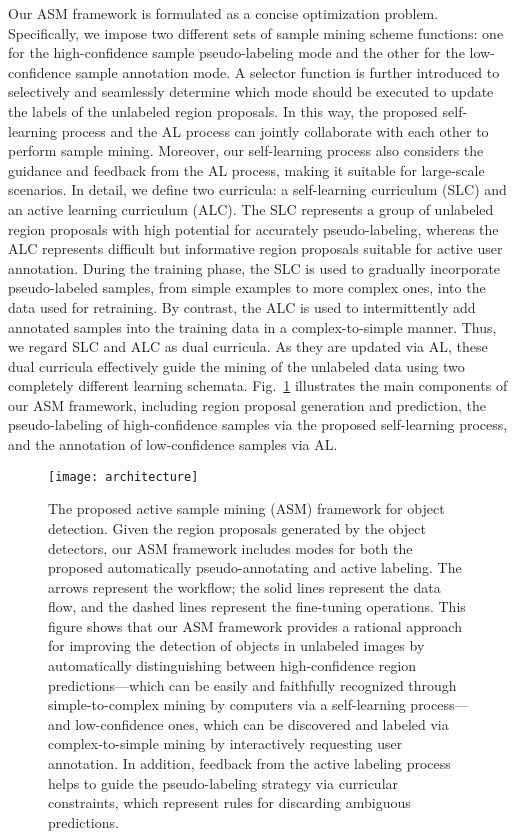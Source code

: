\documentclass[journal]{IEEEtran}
\begin{document}
Our {ASM} framework is formulated as a concise optimization problem. Specifically, we impose two different sets of sample mining scheme functions: one for the high-confidence sample pseudo-labeling mode and the other for the low-confidence sample annotation mode. A selector function is further introduced to {selectively and} seamlessly determine which mode should be executed to update the labels of the unlabeled region proposals. In this way, the proposed {self-learning} process and the AL process can jointly collaborate with each other to perform sample mining. Moreover, {our self-learning} process also considers {the} guidance and feedback from the AL process, making it suitable for large-scale scenarios. In detail, we define two curricula: a self-learning curriculum (SLC) and an active learning curriculum (ALC). The SLC represents a group of unlabeled region proposals with high potential for {accurately} pseudo-labeling, whereas the ALC represents difficult but informative region proposals suitable for active user annotation. During the training phase, the SLC is used to gradually incorporate pseudo-labeled samples, from simple examples to more complex ones, into the data used for retraining. By contrast, the ALC is used to intermittently add annotated samples into the training data in a complex-to-simple manner. Thus, we regard SLC and ALC as dual curricula. As they are updated via AL, these dual curricula effectively guide {the mining of the unlabeled data} using two completely different learning schemata. {Fig.~\ref{fig:architecture} illustrates the main components of our {ASM} framework, including region proposal generation and prediction, the pseudo-labeling of high-confidence samples via the proposed self-learning process, and the annotation of low-confidence samples via AL.}

\begin{figure}[t]
\center
\texttt{[image: architecture]}
\vspace{-10pt}
\caption{The proposed active sample mining (ASM) framework for object detection. Given the region proposals generated by the object detectors, our ASM framework includes modes for both the proposed automatically pseudo-annotating and active labeling. The arrows represent the workflow; the solid lines represent the data flow, and the dashed lines represent the fine-tuning operations. This figure shows that our ASM framework provides a rational approach for improving the detection of objects in unlabeled images by automatically distinguishing between high-confidence region predictions---which can be easily and faithfully recognized through simple-to-complex mining by computers via a self-learning process---and low-confidence ones, which can be discovered and labeled via complex-to-simple mining by interactively requesting user annotation. In addition, feedback from the active labeling process helps to guide the pseudo-labeling strategy via curricular constraints, which represent rules for discarding ambiguous predictions.
}
\vspace{-10pt}
\label{fig:architecture}
\end{figure}
\end{document}
